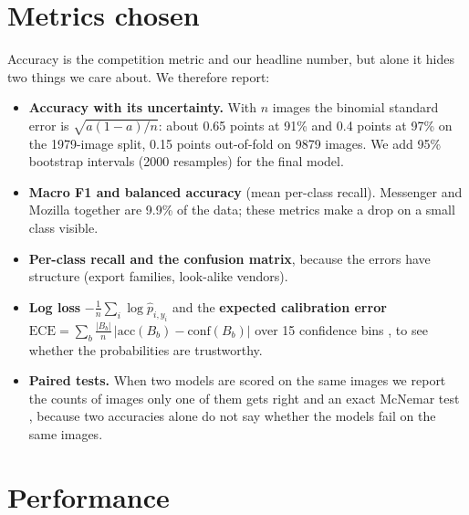 \documentclass[11pt,a4paper]{article}
\newcommand{\pct}[1]{#1\%}
\begin{document}


\section{Metrics chosen}
\label{sec:metrics}
Accuracy is the competition metric and our headline number, but alone it hides two things we care about. We therefore report:
\begin{itemize}[leftmargin=1.2em]
  \item \textbf{Accuracy with its uncertainty.} With $n$ images the binomial standard error is $\sqrt{a(1-a)/n}$: about 0.65 points at \pct{91} and 0.4 points at \pct{97} on the \num{1979}-image split, 0.15 points out-of-fold on \num{9879} images. We add 95\% bootstrap intervals (\num{2000} resamples) for the final model.
  \item \textbf{Macro F1 and balanced accuracy} (mean per-class recall). Messenger and Mozilla together are \pct{9.9} of the data; these metrics make a drop on a small class visible.
  \item \textbf{Per-class recall and the confusion matrix}, because the errors have structure (export families, look-alike vendors).
  \item \textbf{Log loss} $-\frac1n\sum_i\log\hat p_{i,y_i}$ and the \textbf{expected calibration error} $\mathrm{ECE}=\sum_b\frac{|B_b|}{n}\,|\mathrm{acc}(B_b)-\mathrm{conf}(B_b)|$ over 15 confidence bins \cite{guo2017calibration}, to see whether the probabilities are trustworthy.
  \item \textbf{Paired tests.} When two models are scored on the same images we report the counts of images only one of them gets right and an exact McNemar test \cite{mcnemar1947,dietterich1998tests}, because two accuracies alone do not say whether the models fail on the same images.
\end{itemize}

\section{Performance}
\label{sec:perf}


\end{document}
